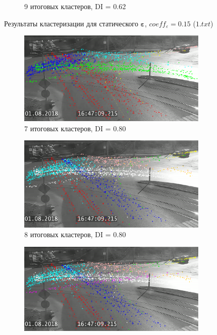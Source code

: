 \begin{figure}[!htb]
\begin{subfigure}[!htb]{0.8\textwidth}
		\caption{9 итоговых кластеров, DI = 0.62}
		\label{fig:1-9cl-015}
	\end{subfigure}
	\caption{Результаты кластеризации для статического $\bm{\varepsilon}$, $coeff_\varepsilon = 0.15$ ($1.txt$)}
	\label{fig:clust-res-1-015}
\end{figure}

\begin{figure}[!htb]
	\centering
	\begin{subfigure}[!htb]{0.8\textwidth}
		\centering{}
		\includegraphics[width=\textwidth]{images/cl-res/2-7cl-01.png}
		\caption{7 итоговых кластеров, DI = 0.80}
		\label{fig:2-7cl-01}
	\end{subfigure}
	\hfill
	\begin{subfigure}[!htb]{0.8\textwidth}
		\centering{}
		\includegraphics[width=\textwidth]{images/cl-res/2-8cl-01.png}
		\caption{8 итоговых кластеров, DI = 0.80}
		\label{fig:2-8cl-01}
	\end{subfigure}
	\hfill
	\begin{subfigure}[!htb]{0.8\textwidth}
		\centering{}
		\includegraphics[width=\textwidth]{images/cl-res/2-9cl-01.png}

\end{subfigure}
\end{figure}

